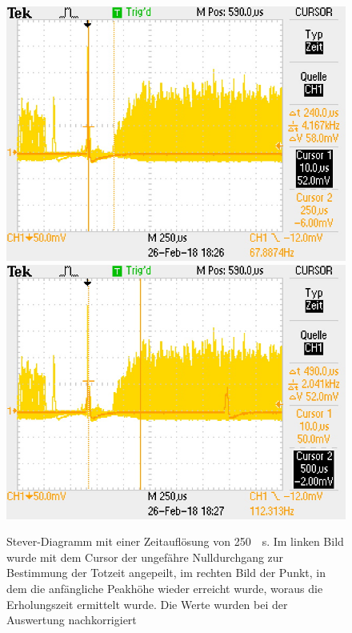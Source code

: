 \documentclass[12pt,a4paper]{article}
\begin{document}
\begin{figure}
\centering
\includegraphics[scale=0.49]{Bilder/Stever/Stever1_1.PNG}
\includegraphics[scale=0.49]{Bilder/Stever/Stever1_2.PNG}
\caption{Stever-Diagramm mit einer Zeitauflösung von \SI{250}{\mu s}. Im linken Bild wurde mit dem Cursor der ungefähre Nulldurchgang zur Bestimmung der Totzeit angepeilt, im rechten Bild der Punkt, in dem die anfängliche Peakhöhe wieder erreicht wurde, woraus die Erholungszeit ermittelt wurde. Die Werte wurden bei der Auswertung nachkorrigiert}
\label{fig:Stever}
\end{figure}
\end{document}

